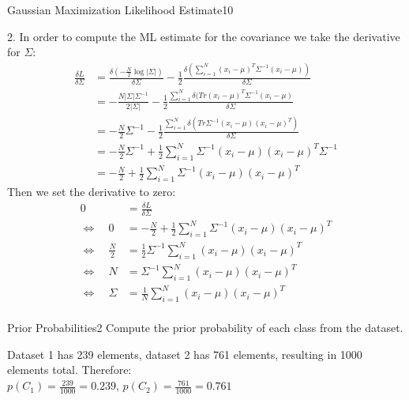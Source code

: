 \begin{questions}
\begin{question}{Gaussian Maximization Likelihood Estimate}{10}
\begin{answer}
2. In order to compute the ML estimate for the covariance we take the derivative for $\Sigma$:
\begin{align*}
\frac{\delta L}{\delta \Sigma} &= \frac{\delta (-\frac{N}{2} \log |\Sigma |)}{\delta \Sigma} - \frac{1}{2} \frac{\delta (\sum_{i=1}^{N}(x_i-\mu )^T \Sigma^{-1}(x_i-\mu ))}{\delta \Sigma}\\
&= -\frac{N|\Sigma |\Sigma^{-1}}{2|\Sigma |}-\frac{1}{2} \frac{\sum_{i=1}^{N} \delta (Tr(x_i-\mu )^T \Sigma^{-1}(x_i-\mu )}{\delta \Sigma} \\
&= -\frac{N}{2} \Sigma^{-1} - \frac{1}{2} \frac{\sum_{i=1}^{N} \delta ( Tr\Sigma^{-1}(x_i-\mu )(x_i-\mu )^T)}{\delta \Sigma} \\
&= -\frac{N}{2} \Sigma^{-1} + \frac{1}{2} \sum_{i=1}^{N} \Sigma^{-1} (x_i-\mu )(x_i-\mu )^T \Sigma^{-1} \\
&= -\frac{N}{2} + \frac{1}{2} \sum_{i=1}^{N} \Sigma^{-1} (x_i-\mu )(x_i-\mu )^T
\end{align*}
Then we set the derivative to zero:
\begin{align*}
0 &= \frac{\delta L}{\delta \Sigma} \\
\Leftrightarrow \quad 0 &= -\frac{N}{2} + \frac{1}{2} \sum_{i=1}^{N} \Sigma^{-1} (x_i-\mu )(x_i-\mu )^T \\
\Leftrightarrow \quad \frac{N}{2} &= \frac{1}{2} \Sigma^{-1} \sum_{i=1}^{N} (x_i-\mu )(x_i-\mu )^T \\
\Leftrightarrow \quad N &= \Sigma^{-1} \sum_{i=1}^{N} (x_i-\mu )(x_i-\mu )^T \\
\Leftrightarrow \quad \Sigma &= \frac{1}{N} \sum_{i=1}^{N} (x_i-\mu )(x_i-\mu )^T \\
\end{align*}

\end{answer}

\end{question}



\begin{question}{Prior Probabilities}{2}
Compute the prior probability of each class from the dataset. 

\begin{answer}
Dataset 1 has 239 elements, dataset 2 has 761 elements, resulting in 1000 elements total. Therefore:\\
$p(C_1) = \frac{239}{1000}=0.239$, $p(C_2) = \frac{761}{1000}=0.761$
\end{answer}


\end{question}
\end{questions}
